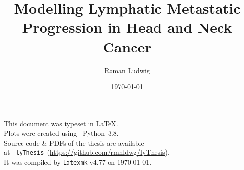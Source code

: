 \documentclass[
    a4paper,
    12pt,
]{report}
\title{Modelling Lymphatic Metastatic Progression in Head and Neck Cancer}
\author{Roman Ludwig}
\date{\monthyeardate\today}
\begin{document}
    \pagestyle{empty}
    
    \pagestyle{plain}
    

    \begin{center}
        This document was typeset in \LaTeX.\\
        Plots were created using ~Python~3.8.\\
        Source code \& PDFs of the thesis are available\\
        at ~\texttt{lyThesis}~{\footnotesize\textup{(\url{https://github.com/rmnldwg/lyThesis})}}.\\
        It was compiled by \texttt{Latexmk} v4.77 on \today.
    \end{center}
\end{document}
